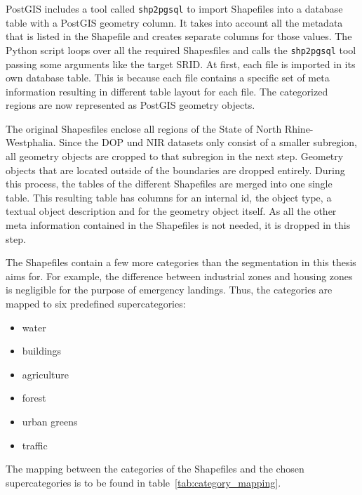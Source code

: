 PostGIS includes a tool called \texttt{shp2pgsql} to import Shapefiles into a database table with a PostGIS geometry column. It takes into account all the metadata that is listed in the Shapefile and creates separate columns for those values. The Python script loops over all the required Shapesfiles and calls the \texttt{shp2pgsql} tool passing some arguments like the target SRID. At first, each file is imported in its own database table. This is because each file contains a specific set of meta information resulting in different table layout for each file. The categorized regions are now represented as PostGIS geometry objects.

The original Shapesfiles enclose all regions of the State of North Rhine-Westphalia. Since the DOP und NIR datasets only consist of a smaller subregion, all geometry objects are cropped to that subregion in the next step. Geometry objects that are located outside of the boundaries are dropped entirely. During this process, the tables of the different Shapefiles are merged into one single table. This resulting table has columns for an internal id, the object type, a textual object description and for the geometry object itself. As all the other meta information contained in the Shapefiles is not needed, it is dropped in this step.

The Shapefiles contain a few more categories than the segmentation in this thesis aims for. For example, the difference between industrial zones and housing zones is negligible for the purpose of emergency landings. Thus, the categories are mapped to six predefined supercategories:
\begin{itemize}
  \setlength\itemsep{1mm}
  \item water
  \item buildings
  \item agriculture
  \item forest
  \item urban greens
  \item traffic
\end{itemize}
The mapping between the categories of the Shapefiles and the chosen supercategories is to be found in table~\ref{tab:category_mapping}.

